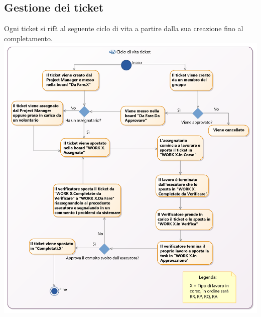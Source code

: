 \documentclass[NormeDiProgetto.tex]{subfiles}
\begin{document}
	\subsection{Gestione dei ticket}
	 Ogni ticket si rifà al seguente ciclo di vita a partire dalla sua creazione fino al completamento.\\
	\includegraphics[scale=0.3]{../../common/images/AsanaFlow}
	
\end{document}
